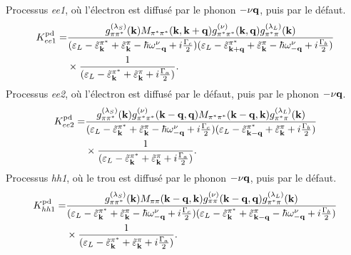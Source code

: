 \noindent
Processus \textit{ee1}, où l'électron est diffusé par le phonon $-\nu\mathbf{q}$, puis par le défaut.
\begin{equation}
    \begin{split}
    K_{ee1}^{\text{pd}} = &\frac{g^{(\lambda_S)}_{\pi\pi^*}(\mathbf{k})M_{\pi^*\pi^*}(\mathbf{k},\mathbf{k}+\mathbf{q})g^{(\nu)}_{\pi^*\pi^*}(\mathbf{k},\mathbf{q})g_{\pi^*\pi}^{(\lambda_L)}(\mathbf{k})}{(\varepsilon_L-\tilde{\varepsilon}^{\pi^*}_{\mathbf{k}}+\tilde{\varepsilon}^\pi_{\mathbf{k}}-\hbar\omega_{-\mathbf{q}}^\nu+i\frac{\Gamma_c}{2})(\varepsilon_L-\tilde{\varepsilon}_{\mathbf{k}+\mathbf{q}}^{\pi^*}+\tilde{\varepsilon}_{\mathbf{k}}^\pi-\hbar\omega_{-\mathbf{q}}^\nu+i\frac{\Gamma_b}{2})}\\
    &\times\frac{1}{(\varepsilon_L-\tilde{\varepsilon}_{\mathbf{k}}^{\pi^*}+\tilde{\varepsilon}_{\mathbf{k}}^\pi+i\frac{\Gamma_a}{2})}.\label{eqn:pd_ee1}
    \end{split}
\end{equation}
Processus \textit{ee2}, où l'électron est diffusé par le défaut, puis par le phonon $-\nu\mathbf{q}$.
\begin{equation}
    \begin{split}
    K_{ee2}^{\text{pd}} = &\frac{g^{(\lambda_S)}_{\pi\pi^*}(\mathbf{k})g^{(\nu)}_{\pi^*\pi^*}(\mathbf{k}-\mathbf{q},\mathbf{q})M_{\pi^*\pi^*}(\mathbf{k}-\mathbf{q},\mathbf{k})g_{\pi^*\pi}^{(\lambda_L)}(\mathbf{k})}{(\varepsilon_L-\tilde{\varepsilon}_{\mathbf{k}}^{\pi^*}+\tilde{\varepsilon}_{\mathbf{k}}^\pi-\hbar\omega_{-\mathbf{q}}^\nu+i\frac{\Gamma_c}{2})(\varepsilon_L-\tilde{\varepsilon}_{\mathbf{k}-\mathbf{q}}^{\pi^*}+\tilde{\varepsilon}_{\mathbf{k}}^\pi+i\frac{\Gamma_b}{2})}\\
    &\times\frac{1}{(\varepsilon_L-\tilde{\varepsilon}_{\mathbf{k}}^{\pi^*}+\tilde{\varepsilon}_{\mathbf{k}}^\pi+i\frac{\Gamma_a}{2})}.\label{eqn:pd_ee2}
    \end{split}
\end{equation}
Processus \textit{hh1}, où le trou est diffusé par le phonon $-\nu\mathbf{q}$, puis par le défaut.
\begin{equation}
    \begin{split}
    K_{hh1}^{\text{pd}} = &\frac{g^{(\lambda_S)}_{\pi\pi^*}(\mathbf{k})M_{\pi\pi}(\mathbf{k}-\mathbf{q}, \mathbf{k})g_{\pi\pi}^{(\nu)}(\mathbf{k}-\mathbf{q},\mathbf{q})g_{\pi^*\pi}^{(\lambda_L)}(\mathbf{k})}{(\varepsilon_L-\tilde{\varepsilon}_{\mathbf{k}}^{\pi^*}+\tilde{\varepsilon}_{\mathbf{k}}^\pi-\hbar\omega_{-\mathbf{q}}^\nu+i\frac{\Gamma_c}{2})(\varepsilon_L-\tilde{\varepsilon}_{\mathbf{k}}^{\pi^*}+\tilde{\varepsilon}_{\mathbf{k}-\mathbf{q}}^\pi-\hbar\omega_{-\mathbf{q}}^\nu+i\frac{\Gamma_b}{2})}\\
    &\times\frac{1}{(\varepsilon_L-\tilde{\varepsilon}_{\mathbf{k}}^{\pi^*}+\tilde{\varepsilon}_{\mathbf{k}}^\pi+i\frac{\Gamma_a}{2})}.\label{eqn:pd_hh1}
    \end{split}
\end{equation}
